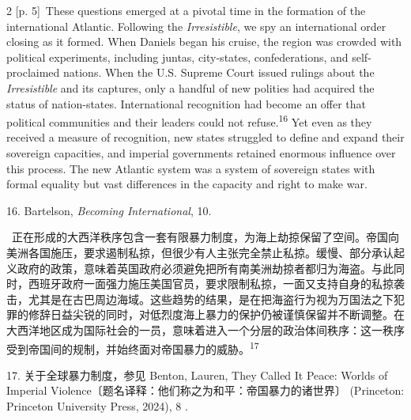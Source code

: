 \documentclass[10pt,a4paper]{article}
\begin{document}
\begin{paracol}{2}
\switchcolumn
{\scriptsize\color{gray} [p. 5]}\ These questions emerged at a pivotal time in the formation of the international Atlantic. Following the \textit{Irresistible}, we spy an international order closing as it formed. When Daniels began his cruise, the region was crowded with political experiments, including juntas, city-states, confederations, and self-proclaimed nations. When the U.S. Supreme Court issued rulings about the \textit{Irresistible} and its captures, only a handful of new polities had acquired the status of nation-states. International recognition had become an offer that political communities and their leaders could not refuse.\nobreak\textsuperscript{16} Yet even as they received a measure of recognition, new states struggled to define and expand their sovereign capacities, and imperial governments retained enormous influence over this process. The new Atlantic system was a system of sovereign states with formal equality but vast differences in the capacity and right to make war.\par{\small 16. Bartelson, \textit{Becoming International}, 10.\par}
\switchcolumn*
{\scriptsize\color{gray} [p. 5]}\ 正在形成的大西洋秩序包含一套有限暴力制度，为海上劫掠保留了空间。帝国向美洲各国施压，要求遏制私掠，但很少有人主张完全禁止私掠。缓慢、部分承认起义政府的政策，意味着英国政府必须避免把所有南美洲劫掠者都归为海盗。与此同时，西班牙政府一面强力施压美国官员，要求限制私掠，一面又支持自身的私掠袭击，尤其是在古巴周边海域。这些趋势的结果，是在把海盗行为视为万国法之下犯罪的修辞日益尖锐的同时，对低烈度海上暴力的保护仍被谨慎保留并不断调整。在大西洋地区成为国际社会的一员，意味着进入一个分层的政治体间秩序：这一秩序受到帝国间的规制，并始终面对帝国暴力的威\mbox{胁。\textsuperscript{17}}\par{\small 17. 关于全球暴力制度，参见 Benton, Lauren, They Called It Peace: Worlds of Imperial Violence〔题名译释：他们称之为和平：帝国暴力的诸世界〕 (Princeton: Princeton University Press, 2024), 8 .\par}
\switchcolumn

\end{paracol}
\end{document}
